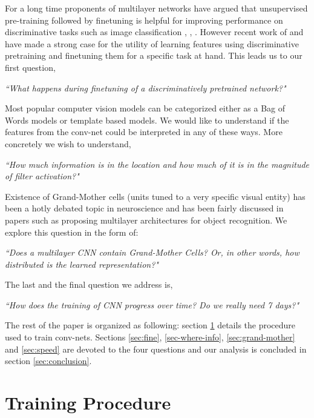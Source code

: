 \documentclass[runningheads]{llncs}
\begin{document}
For a long time proponents of multilayer networks have argued that unsupervised pre-training followed by finetuning is helpful for improving performance on discriminative tasks such as image classification \cite{GoogleCat}, \cite{DeepPre}, \cite{HintonPre}. However recent work of \cite{Decaf} and \cite{Rcnn} have made a strong case for the utility of learning features using discriminative pretraining and finetuning them for a specific task at hand. This leads us to our first question,
\begin{center}
\textit{``What happens during finetuning of a discriminatively pretrained network?"}
\end{center}
Most popular computer vision models can be categorized either as a Bag of Words models or template based models. We would like to understand if the features from the conv-net could be interpreted in any of these ways. More concretely we wish to understand, 
\begin{center}
\textit{``How much information is in the location and how much of it is in the magnitude of filter activation?"}
\end{center}

Existence of Grand-Mother cells (units tuned to a very specific visual entity)  has been a hotly debated topic in neuroscience \cite{Grandmother} and has been fairly discussed in papers such as \cite{GoogleCat} proposing multilayer architectures for object recognition. We explore this question in the form of: 
\begin{center}
\textit{``Does a multilayer CNN contain Grand-Mother Cells? Or, in other words, how distributed is the learned representation?" }
\end{center}
The last and the final question we address is,
\begin{center}
\textit{``How does the training of CNN progress over time? Do we really need 7 days?"}
\end{center}

The rest of the paper is organized as following: section \ref{sec:train} details the procedure used to train conv-nets.  Sections \ref{sec:fine}, \ref{sec-where-info}, \ref{sec:grand-mother} and \ref{sec:speed} are devoted to the four questions and our analysis is concluded in section \ref{sec:conclusion}.
\section{Training Procedure}
\label{sec:train}
\end{document}
